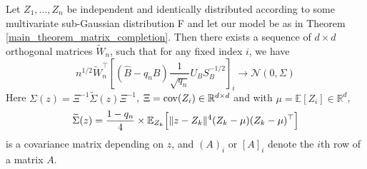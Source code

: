 \begin{lemma}
\label{cov_missing_entries}
 Let $Z_1, \dots, Z_n$ be independent and identically distributed according to some multivariate sub-Gaussian distribution F and let our model be as in Theorem \ref{main_theorem_matrix_completion}. Then there exists a sequence of $d \times d$ orthogonal matrices $\tilde{W}_n$, such that for any fixed index $i$, we have
  $$ n^{1/2} \tilde{W}_n^{\top} [(\hat{B} - q_n B)  \frac{1}{\sqrt{q_n}} U_B S_B^{-1/2}]_{i} \longrightarrow \mathcal{N}(0, \Sigma)$$
  Here $\Sigma (z)= {\Xi}^{-1} \widetilde{\Sigma}(z) {\Xi}^{-1}$, $\Xi = \mathrm{cov}(Z_i) \in {\mathbb R}^{d \times d}$ and with $\mu = \mathbb{E}[Z_i] \in \mathbb{R}^{d}$,
  $$\widetilde{\Sigma} (z) = \frac{1-q_n}{4} \times \mathbb{E}_{Z_k} \Bigl[ \|z - Z_k\|^4 (Z_k- {\mu}) (Z_k - {\mu})^\top\Bigr]$$ 
  is a covariance matrix depending on $z$, and $(A)_i$ or $[A]_i$ denote the $i$th row of a matrix $A$. 
\end{lemma}
